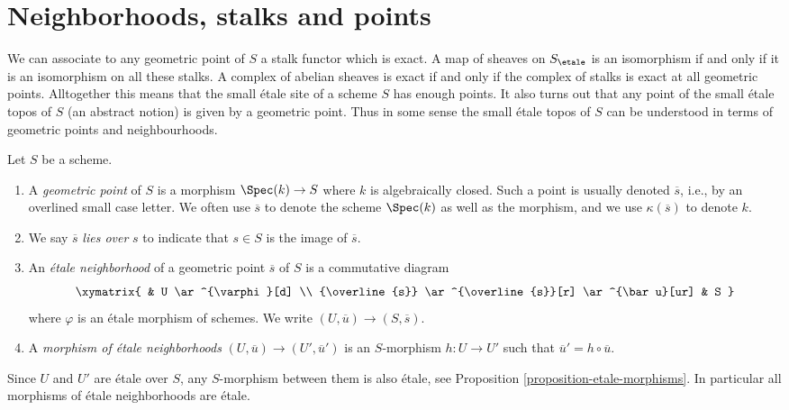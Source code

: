 \section{Neighborhoods, stalks and points}
\label{section-stalks}

\noindent
We can associate to any geometric point of $S$ a stalk functor which is
exact. A map of sheaves on $S_\etale$ is an isomorphism if and only
if it
is an isomorphism on all these stalks. A complex of abelian sheaves is
exact if and only if the complex of stalks is exact at all geometric points.
Alltogether this means that the small \'etale site of a scheme $S$
has enough points. It also turns out that any point of the small \'etale topos
of $S$ (an abstract notion) is given by a geometric point.
Thus in some sense the small \'etale topos of $S$ can be understood in
terms of geometric points and neighbourhoods.

\begin{definition}
\label{definition-geometric-point}
Let $S$ be a scheme.
\begin{enumerate}
\item A {\it geometric point} of $S$ is a morphism
$\Spec(k) \to S$ where $k$ is algebraically closed.
Such a point is usually denoted $\overline{s}$, i.e., by an overlined
small case letter. We often use $\overline{s}$ to denote the scheme
$\Spec(k)$ as well as the morphism, and we use $\kappa(\overline{s})$
to denote $k$.
\item We say $\overline{s}$ {\it lies over} $s$
to indicate that $s \in S$ is the image of $\overline{s}$.
\item An {\it \'etale neighborhood} of a geometric point $\overline{s}$
of $S$ is a commutative diagram
$$
\xymatrix{
& U \ar^{\varphi}[d] \\
{\overline{s}} \ar^{\overline{s}}[r] \ar^{\bar u}[ur] & S
}
$$
where $\varphi$ is an \'etale morphism of schemes.
We write $(U, \overline{u}) \to (S, \overline{s})$.
\item A {\it morphism of \'etale neighborhoods}
$(U, \overline{u}) \to (U', \overline{u}')$
is an $S$-morphism $h: U \to U'$
such that $\overline{u}' = h \circ \overline{u}$.
\end{enumerate}
\end{definition}

\begin{remark}
\label{remark-etale-between-etale}
Since $U$ and $U'$ are \'etale over $S$, any $S$-morphism
between them is also \'etale, see
Proposition \ref{proposition-etale-morphisms}.
In particular all morphisms of \'etale neighborhoods are \'etale.
\end{remark}

